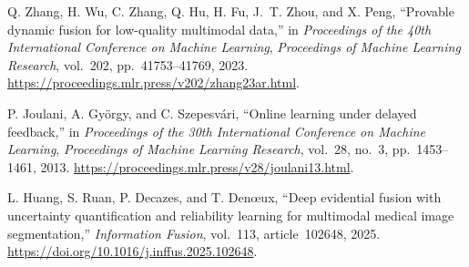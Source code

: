 Q. Zhang, H. Wu, C. Zhang, Q. Hu, H. Fu, J.~T. Zhou, and X. Peng,
``Provable dynamic fusion for low-quality multimodal data,''
in \emph{Proceedings of the 40th International Conference on Machine Learning},
\emph{Proceedings of Machine Learning Research},
vol.~202, pp.~41753--41769, 2023.
\url{https://proceedings.mlr.press/v202/zhang23ar.html}.

P. Joulani, A. Gy{\"o}rgy, and C. Szepesv{\'a}ri,
``Online learning under delayed feedback,''
in \emph{Proceedings of the 30th International Conference on Machine Learning},
\emph{Proceedings of Machine Learning Research},
vol.~28, no.~3, pp.~1453--1461, 2013.
\url{https://proceedings.mlr.press/v28/joulani13.html}.

L. Huang, S. Ruan, P. Decazes, and T. Den{\oe}ux,
``Deep evidential fusion with uncertainty quantification and reliability
learning for multimodal medical image segmentation,''
\emph{Information Fusion}, vol.~113, article~102648, 2025.
\url{https://doi.org/10.1016/j.inffus.2025.102648}.
